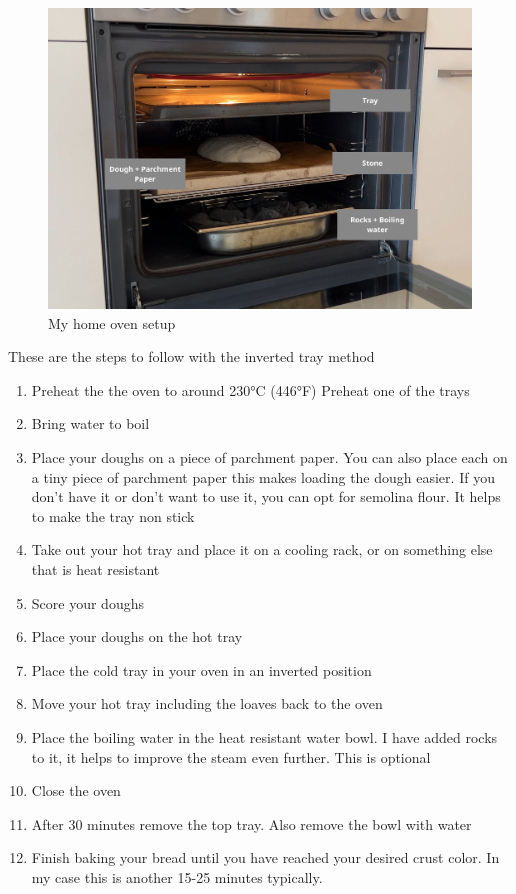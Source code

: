 \begin{figure}[!htb]
  \includegraphics[width=\textwidth]{baking-example.jpg}
  \caption{My home oven setup}
\end{figure}

These are the steps to follow with the inverted tray method
\begin{enumerate}
\item Preheat the the oven to around 230°C (446°F)
Preheat one of the trays
\item Bring water to boil
\item Place your doughs on a piece of parchment paper. You
can also place each on a tiny piece of parchment paper
this makes loading the dough easier. If you don't
have it or don't want to use it, you can opt for 
semolina flour. It helps to make the tray non stick
\item Take out your hot tray and place it
on a cooling rack, or on something else that
is heat resistant
\item Score your doughs
\item Place your doughs on the hot tray
\item Place the cold tray in your oven in an inverted position
\item Move your hot tray including the loaves back
to the oven
\item Place the boiling water in the heat resistant
water bowl. I have added rocks to it, it helps
to improve the steam even further. This is optional
\item Close the oven
\item After 30 minutes remove the top tray. Also remove the bowl with water
\item Finish baking your bread until you have reached your desired
crust color. In my case this is another 15-25 minutes typically.
\end{enumerate}

